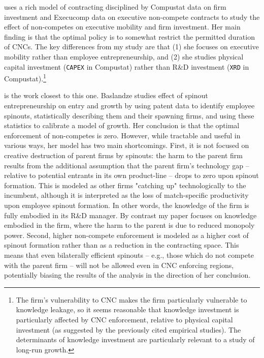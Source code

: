 \documentclass[11pt,english]{article}
\theoremstyle{remark}
\begin{document}
\cite{shi_restrictions_2018} uses a rich model of contracting disciplined by Compustat data on firm investment and Execucomp data on executive non-compete contracts to study the effect of non-competes on executive mobility and firm investment. Her main finding is that the optimal policy is to somewhat restrict the permitted duration of CNCs. The key differences from my study are that (1) she focuses on executive mobility rather than employee entrepreneurship, and (2) she studies physical capital investment (\texttt{CAPEX} in Compustat) rather than R\&D investment (\texttt{XRD} in Compustat).\footnote{The firm's vulnerability to CNC makes the firm particularly vulnerable to knowledge leakage, so it seems reasonable that knowledge investment is particularly affected by CNC enforcement, relative to physical capital investment (as suggested by the previously cited empirical studies). The determinants of knowledge investment are particularly relevant to a study of long-run growth.} 

\cite{baslandze_spinout_2019} is the work closest to this one. Baslandze studies effect of spinout entrepreneurship on entry and growth by using patent data to identify employee spinouts, statistically describing them and their spawning firms, and using these statistics to calibrate a model of growth. Her conclusion is that the optimal enforcement of non-competes is zero. However, while tractable and useful in various ways, her model has two main shortcomings. First, it is not focused on creative destruction of parent firms by spinouts: the harm to the parent firm results from the additional assumption that the parent firm's technology gap -- relative to potential entrants in its own product-line -- drops to zero upon spinout formation. This is modeled as other firms "catching up" technologically to the incumbent, although it is interpreted as the loss of match-specific productivity upon employee spinout formation. In other words, the knowledge of the firm is fully embodied in its R\&D manager. By contrast my paper focuses on knowledge embodied in the firm, where the harm to the parent is due to reduced monopoly power. Second, higher non-compete enforcement is modeled as a higher cost of spinout formation rather than as a reduction in the contracting space. This means that even bilaterally efficient spinouts -- e.g., those which do not compete with the parent firm -- will not be allowed even in CNC enforcing regions, potentially biasing the results of the analysis in the direction of her conclusion. 
\end{document}
